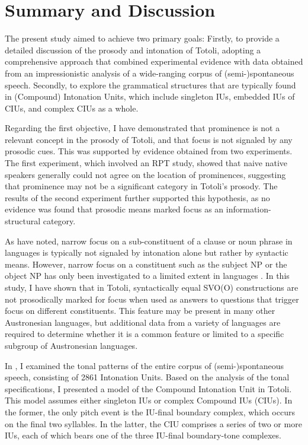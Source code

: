 \chapter{Summary and Discussion}
\label{Summary and Discussion}



The present study aimed to achieve two primary goals: Firstly, to provide a detailed discussion of the prosody and intonation of Totoli, adopting a comprehensive approach that combined experimental evidence with data obtained from an impressionistic analysis of a wide-ranging corpus of (semi-)spontaneous speech. Secondly, to explore the grammatical structures that are typically found in (Compound) Intonation Units, which include singleton IUs, embedded IUs of CIUs, and complex CIUs as a whole.


Regarding the first objective, I have demonstrated that prominence is not a relevant concept in the  prosody of Totoli, and that focus is not signaled by any prosodic cues. This was supported by evidence obtained from two experiments. The first experiment, which involved an RPT study, showed that naive native speakers generally could not agree on the location of prominences, suggesting that prominence may not be a significant category in Totoli's prosody. The results of the second experiment further supported this hypothesis, as no evidence was found that prosodic means marked focus as an information-structural category.

As \citet[376]{Himmelmann_Kaufmann_Prosody} have noted, narrow focus  on a sub-constituent of a clause or noun phrase in  languages is typically not signaled by intonation alone but rather by syntactic means. However, narrow focus on a constituent such as the subject NP or the object NP has only been investigated to a limited extent in  languages \citep[cf. for example][]{Focus_Tagalog, Focus_Tagalog_Kaufmann, KALAND2023101200}. In this study, I have shown that in Totoli, syntactically equal SVO(O) constructions are not prosodically marked for focus when used as answers to questions that trigger focus on different constituents. This feature may be present in many other Austronesian languages, but additional data from a variety of  languages are required to determine whether it is a common feature or limited to a specific subgroup of Austronesian languages.



In , I examined the tonal patterns of the entire corpus of \mbox{(semi-)}spontaneous speech, consisting of 2861 Intonation Units. Based on the analysis of the tonal specifications, I presented a model of the Compound Intonation Unit in Totoli. This model assumes either singleton IUs or complex Compound IUs (CIUs). In the former, the only pitch event is the IU-final boundary complex, which occurs on the final two syllables. In the latter, the CIU comprises a series of two or more IUs, each of which bears one of the three IU-final boundary-tone complexes.

